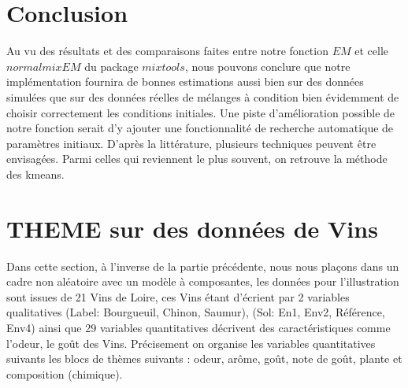 \documentclass[a4paper,french,10pt]{article}
\begin{document}



\newpage

\section{Conclusion}

Au vu des résultats et des comparaisons faites entre notre fonction $EM$ et celle $normalmixEM$ du package $mixtools$, nous pouvons conclure que notre implémentation fournira de bonnes estimations aussi bien sur des données simulées que sur des données réelles de mélanges à condition bien évidemment de choisir correctement les conditions initiales. Une piste d'amélioration possible de notre fonction serait d'y ajouter une fonctionnalité de recherche automatique de paramètres initiaux. D'après la littérature, plusieurs techniques peuvent être envisagées. Parmi celles qui reviennent le plus souvent, on retrouve la méthode des kmeans.


\newpage

\section{THEME sur des données de Vins}

Dans cette section, à l'inverse de la partie précédente, nous nous plaçons dans un cadre non aléatoire avec un modèle à composantes, les données pour l'illustration sont issues de 21 Vins de Loire, ces Vins étant d'écrient par 2 variables qualitatives (Label: Bourgueuil, Chinon, Saumur), (Sol: En1, Env2, Référence, Env4) ainsi que 29 variables quantitatives décrivent des
caractéristiques comme l’odeur, le goût des Vins. \newline
Précisement on organise les variables quantitatives suivants les blocs de thèmes suivants : odeur, arôme, goût, note de goût, plante et composition (chimique).\newline
\end{document}

